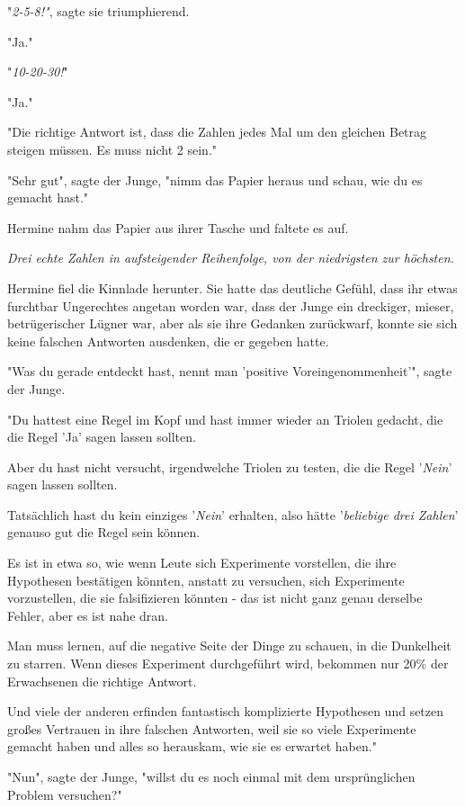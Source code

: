 {"\emph{2-5-8!"}, sagte sie triumphierend.

"Ja."

"\emph{10-20-30!}"

"Ja."

"Die richtige Antwort ist, dass die Zahlen jedes Mal um den gleichen Betrag steigen müssen. Es muss nicht 2 sein."

"Sehr gut", sagte der Junge, "nimm das Papier heraus und schau, wie du es gemacht hast."

Hermine nahm das Papier aus ihrer Tasche und faltete es auf.

\emph{Drei echte Zahlen in aufsteigender Reihenfolge, von der niedrigsten zur höchsten.}

Hermine fiel die Kinnlade herunter. Sie hatte das deutliche Gefühl, dass ihr etwas furchtbar Ungerechtes angetan worden war, dass der Junge ein dreckiger, mieser, betrügerischer Lügner war, aber als sie ihre Gedanken zurückwarf, konnte sie sich keine falschen Antworten ausdenken, die er gegeben hatte.

"Was du gerade entdeckt hast, nennt man 'positive Voreingenommenheit'", sagte der Junge.

"Du hattest eine Regel im Kopf und hast immer wieder an Triolen gedacht, die die Regel 'Ja' sagen lassen sollten.

Aber du hast nicht versucht, irgendwelche Triolen zu testen, die die Regel '\emph{Nein}' sagen lassen sollten.

Tatsächlich hast du kein einziges '\emph{Nein}' erhalten, also hätte '\emph{beliebige drei Zahlen}' genauso gut die Regel sein können.

Es ist in etwa so, wie wenn Leute sich Experimente vorstellen, die ihre Hypothesen bestätigen könnten, anstatt zu versuchen, sich Experimente vorzustellen, die sie falsifizieren könnten - das ist nicht ganz genau derselbe Fehler, aber es ist nahe dran.

Man muss lernen, auf die negative Seite der Dinge zu schauen, in die Dunkelheit zu starren. Wenn dieses Experiment durchgeführt wird, bekommen nur 20\% der Erwachsenen die richtige Antwort.

Und viele der anderen erfinden fantastisch komplizierte Hypothesen und setzen großes Vertrauen in ihre falschen Antworten, weil sie so viele Experimente gemacht haben und alles so herauskam, wie sie es erwartet haben."

"Nun", sagte der Junge, "willst du es noch einmal mit dem ursprünglichen Problem versuchen?"

}
